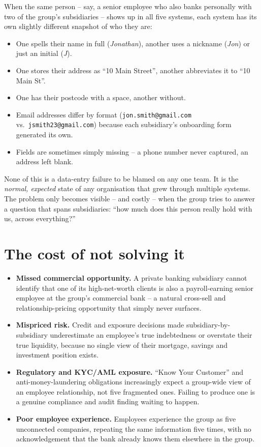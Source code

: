 \documentclass[11pt]{report}
\newcommand{\code}[1]{\lstinline[style=plain]!#1!}
\begin{document}
When the same person -- say, a senior employee who also banks personally with two of the group's subsidiaries -- shows up in all five systems, each system has its own slightly different snapshot of who they are:

\begin{itemize}
\item One spells their name in full (\emph{Jonathan}), another uses a nickname (\emph{Jon}) or just an initial (\emph{J}).
\item One stores their address as ``10 Main Street'', another abbreviates it to ``10 Main St''.
\item One has their postcode with a space, another without.
\item Email addresses differ by format (\code{jon.smith@gmail.com} vs.\ \code{jsmith23@gmail.com}) because each subsidiary's onboarding form generated its own.
\item Fields are sometimes simply missing -- a phone number never captured, an address left blank.
\end{itemize}

\begin{bizbox}
None of this is a data-entry failure to be blamed on any one team. It is the \emph{normal, expected} state of any organisation that grew through multiple systems. The problem only becomes visible -- and costly -- when the group tries to answer a question that spans subsidiaries: ``how much does this person really hold with us, across everything?''
\end{bizbox}

\section{The cost of not solving it}

\begin{itemize}
\item \textbf{Missed commercial opportunity.} A private banking subsidiary cannot identify that one of its high-net-worth clients is also a payroll-earning senior employee at the group's commercial bank -- a natural cross-sell and relationship-pricing opportunity that simply never surfaces.
\item \textbf{Mispriced risk.} Credit and exposure decisions made subsidiary-by-subsidiary underestimate an employee's true indebtedness or overstate their true liquidity, because no single view of their mortgage, savings and investment position exists.
\item \textbf{Regulatory and KYC/AML exposure.} ``Know Your Customer'' and anti-money-laundering obligations increasingly expect a group-wide view of an employee relationship, not five fragmented ones. Failing to produce one is a genuine compliance and audit finding waiting to happen.
\item \textbf{Poor employee experience.} Employees experience the group as five unconnected companies, repeating the same information five times, with no acknowledgement that the bank already knows them elsewhere in the group.
\end{itemize}
\end{document}
